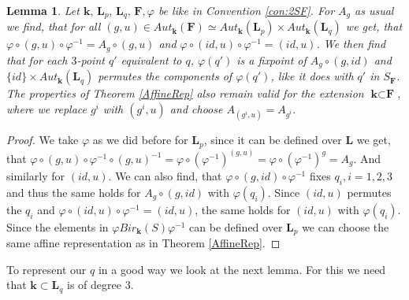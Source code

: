 \documentclass[12pt, oneside, reqno]{amsart}
\newtheorem{lemma}[theorem]{Lemma}
\begin{document}
\begin{lemma}
    Let $\textbf{k}, \, \textbf{L}_p, \, \textbf{L}_q, \, \textbf{F}, \varphi$ be like in Convention \ref{con:2SF}. For $A_g$ as usual we find, that for all $(g,u) \in Aut_{\textbf{k}}(\textbf{F}) \simeq Aut_{\textbf{k}}(\textbf{L}_p) \times Aut_{\textbf{k}}(\textbf{L}_q)$ we get, that $\varphi \circ (g,u) \circ \varphi^{-1} = A_g \circ (g,u)$ and $\varphi \circ (id,u) \circ \varphi^{-1} = (id,u)$. We then find that for each $3$-point $q'$ equivalent to $q$, $\varphi(q')$ is a fixpoint of $A_g \circ (g,id)$ and $\{ id \} \times Aut_{\textbf{k}}(\textbf{L}_q)$ permutes the components of $\varphi(q')$, like it does with $q'$ in $S_{\textbf{F}}$. The properties of Theorem \ref{AffineRep} also remain valid for the extension $\textbf{k} \subset \textbf{F}$, where we replace $g^{i}$ with $(g^{i},u)$ and choose $A_{(g^i,u)} = A_{g^i}$.  
\end{lemma}
\begin{proof}
    We take $\varphi$ as we did before for $\textbf{L}_p$, since it can be defined over $\textbf{L}$ we get, that $\varphi \circ (g,u) \circ \varphi^{-1} \circ (g,u)^{-1} = \varphi \circ (\varphi^{-1})^{(g,u)} = \varphi \circ (\varphi^{-1})^g = A_g$. And similarly for $(id,u)$. We can also find, that $\varphi \circ (g,id) \circ \varphi^{-1}$ fixes $q_i, i=1,2,3$ and thus the same holds for $A_g \circ (g,id)$ with $\varphi(q_i)$. Since $(id,u)$ permutes the $q_i$ and $\varphi \circ (id,u) \circ \varphi^{-1} = (id,u)$, the same holds for $(id,u)$ with $\varphi(q_i)$. Since the elements in $\varphi Bir_{\textbf{k}}(S) \varphi^{-1}$ can be defined over $\textbf{L}_p$ we can choose the same affine representation as in Theorem \ref{AffineRep}. 
\end{proof}
\noindent
To represent our $q$ in a good way we look at the next lemma. For this we need that $\textbf{k} \subset \textbf{L}_q$ is of degree $3$.
\end{document}

